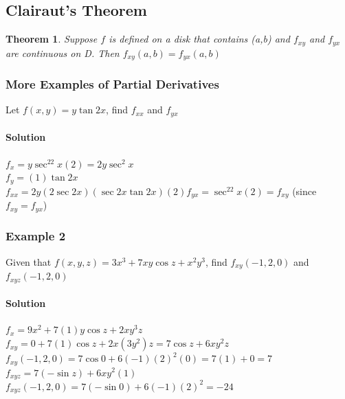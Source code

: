 \documentclass{article}
\newtheorem{theorem}{Theorem}[section]
\begin{document}
\subsection{Clairaut's Theorem}
\begin{theorem}
    Suppose $f$ is defined on a disk that contains (a,b) and $f_{xy}$ and $f_{yx}$ are continuous on D.
    Then $f_{xy}(a,b)=f_{yx}(a,b)$
\end{theorem}

\newpage\subsubsection{More Examples of Partial Derivatives}
Let $f(x,y)=y\tan2x$, find $f_{xx}$ and $f_{yx}$
\paragraph{Solution} $f_x=y\sec^22x(2)=2y\sec^2x$
\\$f_y=(1)\tan2x$
\\$f_{xx}=2y(2\sec2x)(\sec2x\tan2x)(2)$\qquad$f_{yx}=\sec^22x(2)=f_{xy}$ (since $f_{xy}=f_{yx}$)

\subsubsection{Example 2}
Given that $f(x,y,z)=3x^3+7xy\cos{z}+x^2y^3$, find $f_{xy}(-1,2,0)$ and $f_{xyz}(-1,2,0)$
\paragraph{Solution} $f_x=9x^2+7(1)y\cos{z}+2xy^3z$
\\$f_{xy}=0+7(1)\cos{z}+2x(3y^2)z=7\cos{z}+6xy^2z$
\\$f_{xy}(-1,2,0)=7\cos0+6(-1)(2)^2(0)=7(1)+0=7$
\\$f_{xyz}=7(-\sin{z})+6xy^2(1)$
\\$f_{xyz}(-1,2,0)=7(-\sin0)+6(-1)(2)^2=-24$
\end{document}

